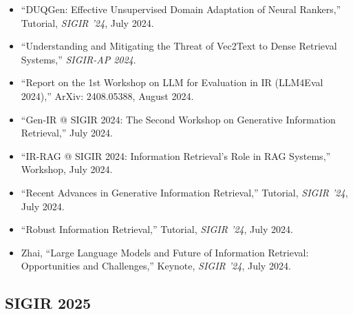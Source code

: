 \documentclass[11pt,letterpaper]{article}
\begin{document}
\begin{itemize}[leftmargin=*]
    \item ``DUQGen: Effective Unsupervised Domain Adaptation of Neural Rankers,'' Tutorial, \textit{SIGIR '24}, July 2024.

    \item ``Understanding and Mitigating the Threat of Vec2Text to Dense Retrieval Systems,'' \textit{SIGIR-AP 2024}.

    \item ``Report on the 1st Workshop on LLM for Evaluation in IR (LLM4Eval 2024),'' ArXiv: 2408.05388, August 2024.

    \item ``Gen-IR @ SIGIR 2024: The Second Workshop on Generative Information Retrieval,'' July 2024.

    \item ``IR-RAG @ SIGIR 2024: Information Retrieval's Role in RAG Systems,'' Workshop, July 2024.

    \item ``Recent Advances in Generative Information Retrieval,'' Tutorial, \textit{SIGIR '24}, July 2024.

    \item ``Robust Information Retrieval,'' Tutorial, \textit{SIGIR '24}, July 2024.

    \item Zhai, ``Large Language Models and Future of Information Retrieval: Opportunities and Challenges,'' Keynote, \textit{SIGIR '24}, July 2024.
\end{itemize}

\subsection{SIGIR 2025}
\end{document}
